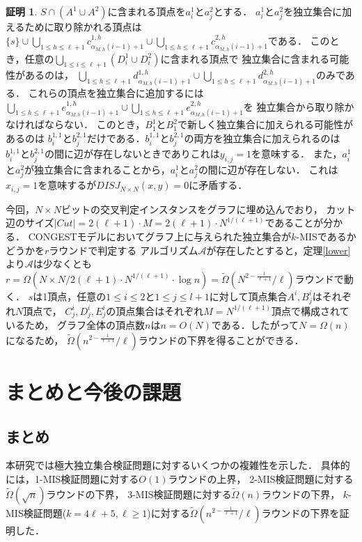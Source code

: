 \documentclass[12pt]{thesis}
\newcommand{\CONGEST}{\textsf{CONGEST}}
\theoremstyle{definition}
\newtheorem*{prf*}{証明}
\begin{document}
\begin{prf*}
$S \cap (A^{1}\cup A^{2})$に含まれる頂点を$a^{1}_{i}$と$a^{2}_{j}$とする．
$a^{1}_{i}$と$a^{2}_{j}$を独立集合に加えるために取り除かれる頂点は
$\{s\} \cup \bigcup_{1\leq h \leq \ell+1} c^{1,h}_{\alpha_{M,h}(i-1)+1} \cup 
\bigcup_{1\leq h \leq \ell+1} c^{2,h}_{\alpha_{M,h}(i-1)+1}$である．
このとき，任意の$\bigcup_{1 \leq i \leq \ell+1}(D^{1}_{i}\cup D^{2}_{i})$に含まれる頂点で
独立集合に含まれる可能性があるのは，
$\bigcup_{1\leq h \leq \ell+1} d^{1,h}_{\alpha_{M,h}(i-1)+1}\cup 
\bigcup_{1\leq h \leq \ell+1} d^{2,h}_{\alpha_{M,h}(i-1)+1}$のみである．
これらの頂点を独立集合に追加するには
$\bigcup_{1\leq h \leq \ell+1} e^{1,h}_{\alpha_{M,h}(i-1)+1}\cup 
\bigcup_{1\leq h \leq \ell+1} e^{2,h}_{\alpha_{M,h}(i-1)+1}$を
独立集合から取り除かなければならない．
このとき，$B^{1}_{1}$と$B^{2}_{1}$で新しく独立集合に加えられる可能性があるのは
$b^{1,1}_{i}$と$b^{2,1}_{j}$だけである．$b^{1,1}_{i}$と$b^{2,1}_{j}$の両方を独立集合に加えられるのは
$b^{1,1}_{i}$と$b^{2,1}_{j}$の間に辺が存在しないときでありこれは$y_{i,j}=1$を意味する．
また，$a^{1}_{i}$と$a^{2}_{j}$が独立集合に含まれることから，$a^{1}_{i}$と$a^{2}_{j}$の間に辺が存在しない．
これは$x_{i,j}=1$を意味するが$DISJ_{N\times N}(x,y)=0$に矛盾する．

今回，$N \times N$ビットの交叉判定インスタンスをグラフに埋め込んでおり，
カット辺のサイズ$|Cut| = 2(\ell + 1) \cdot M = 2(\ell + 1) \cdot N^{1/(\ell + 1)}$であることが分かる．
{\CONGEST}モデルにおいてグラフ上に与えられた独立集合が$k$-MISであるかどうかを$r$ラウンドで判定する
アルゴリズム$\mathcal{A}$が存在したとすると，定理\ref{lower}より$\mathcal{A}$は少なくとも \\
$r = \Omega \left(N \times N/2(\ell + 1) \cdot N^{1/(\ell + 1)} \cdot \log n\right)=\tilde{\Omega}\left(N^{2 - \frac{1}{\ell + 1}}/\ell \right)$ラウンドで動く．
$s$は1頂点，任意の$1\leq i \leq 2$と$1\leq j \leq l+1$に対して頂点集合$A^{i}, B^{i}_{j}$はそれぞれ$N$頂点で，
$C^{i}_{j},D^{i}_{j},E^{i}_{j}$の頂点集合はそれぞれ$M=N^{1/(\ell + 1)}$頂点で構成されているため，
グラフ全体の頂点数$n$は$n = O(N)$である．したがって$N = \Omega(n)$になるため，
$\tilde{\Omega}\left(n^{2 - \frac{1}{\ell + 1}}/\ell \right)$ラウンドの下界を得ることができる．
\end{prf*}
\newpage

\chapter{まとめと今後の課題}
\section{まとめ}
本研究では極大独立集合検証問題に対するいくつかの複雑性を示した．
具体的には，1-MIS検証問題に対する$O(1)$ラウンドの上界，
2-MIS検証問題に対する$\tilde{\Omega} (\sqrt{n})$ラウンドの下界，
3-MIS検証問題に対する$\tilde{\Omega} (n)$ラウンドの下界，
$k$-MIS検証問題($k = 4\ell + 5, \ell \geq 1$)に対する$\tilde{\Omega}\left(n^{2 - \frac{1}{\ell + 1}}/\ell \right)$ラウンドの下界を証明した．
\end{document}
